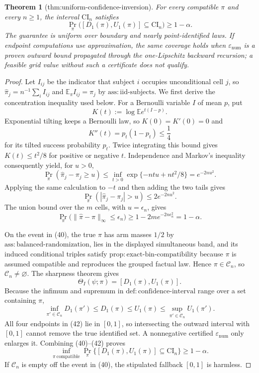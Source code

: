 \documentclass{article}
\newtheorem{theorem}{Theorem}
\begin{document}
\begin{theorem}[thm:uniform-confidence-inversion]\label{thm:uniform-confidence-inversion}
For every compatible \(\pi\) and every \(n\ge1\), the interval \(\mathrm{CI}_n\) satisfies \[\Pr_{\pi}\bigl([D_1(\pi),U_1(\pi)]\subseteq\mathrm{CI}_n\bigr)\ge1-\alpha.\] The guarantee is uniform over boundary and nearly point-identified laws. If endpoint computations use approximation, the same coverage holds when \(\varepsilon_{\mathrm{num}}\) is a proven outward bound propagated through the one-Lipschitz backward recursion; a feasible grid value without such a certificate does not qualify.
\end{theorem}
\begin{proof}
Let \(I_{ij}\) be the indicator that subject \(i\) occupies unconditional cell \(j\), so \(\widehat\pi_j=n^{-1}\sum_i I_{ij}\) and \(\mathbb E_\pi I_{ij}=\pi_j\) by \(\mathrm{ass{:}iid\text{-}subjects}\).  We first derive the concentration inequality used below.  For a Bernoulli variable \(I\) of mean \(p\), put
\[
 K(t):=\log\mathbb E e^{t(I-p)}.
\]
Exponential tilting keeps a Bernoulli law, so \(K(0)=K'(0)=0\) and
\[
 K''(t)=p_t(1-p_t)\le\frac14
\]
for its tilted success probability \(p_t\).  Twice integrating this bound gives \(K(t)\le t^2/8\) for positive or negative \(t\).  Independence and Markov's inequality consequently yield, for \(u>0\),
\[
 \Pr_\pi(\widehat\pi_j-\pi_j\ge u)
 \le\inf_{t>0}\exp\{-ntu+nt^2/8\}=e^{-2nu^2}.
\]
Applying the same calculation to \(-t\) and then adding the two tails gives
\[
 \Pr_\pi(|\widehat\pi_j-\pi_j|>u)\le2e^{-2nu^2}.            \tag{39}
\]
The union bound over the \(m\) cells, with \(u=\epsilon_n\), gives
\[
 \Pr_\pi\bigl(\|\widehat\pi-\pi\|_\infty\le\epsilon_n\bigr)
 \ge1-2m e^{-2n\epsilon_n^2}=1-\alpha.                     \tag{40}
\]

On the event in (40), the true \(\pi\) has arm masses \(1/2\) by \(\mathrm{ass{:}balanced\text{-}randomization}\), lies in the displayed simultaneous band, and its induced conditional triples satisfy \(\mathrm{prop{:}exact\text{-}bin\text{-}compatibility}\) because \(\pi\) is assumed compatible and reproduces the grouped factual law.  Hence \(\pi\in\mathcal C_n\), so \(\mathcal C_n\ne\varnothing\).  The sharpness theorem gives
\[
 \Theta_I(\psi;\pi)=[D_1(\pi),U_1(\pi)].                   \tag{41}
\]
Because the infimum and supremum in \(\mathrm{def{:}confidence\text{-}interval}\) range over a set containing \(\pi\),
\[
 \inf_{\pi'\in\mathcal C_n}D_1(\pi')
 \le D_1(\pi)\le U_1(\pi)
 \le\sup_{\pi'\in\mathcal C_n}U_1(\pi').                 \tag{42}
\]
All four endpoints in (42) lie in \([0,1]\), so intersecting the outward interval with \([0,1]\) cannot remove the true identified set.  A nonnegative certified \(\varepsilon_{\mathrm{num}}\) only enlarges it.  Combining (40)--(42) proves
\[
 \inf_{\pi\ \mathrm{compatible}}
 \Pr_\pi\{[D_1(\pi),U_1(\pi)]\subseteq\mathrm{CI}_n\}
 \ge1-\alpha.
\]
If \(\mathcal C_n\) is empty off the event in (40), the stipulated fallback \([0,1]\) is harmless.


\end{proof}
\end{document}
